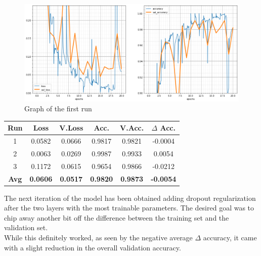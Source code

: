 \begin{figure}[H]
	\begin{center}
	\includegraphics[width=\linewidth]{Immagini/conv-drop-pool-1}
	\caption{Graph of the first run}
	\end{center}
\end{figure}
\begin{table}[H]
	\centering
	\begin{tabular}{cccccc}
		\textbf{Run} &\textbf{Loss}&\textbf{V.Loss} &\textbf{Acc.}&\textbf{V.Acc.}&\textbf{$\Delta$ Acc.} \\ \hline
		1   & 0.0582    & 0.0666    & 0.9817    & 0.9821    & -0.0004\\
		2   & 0.0063    & 0.0269    & 0.9987    & 0.9933    & 0.0054\\
		3   & 0.1172    & 0.0615    & 0.9654    & 0.9866    & -0.0212\\
		\textbf{Avg} & \textbf{0.0606}    & \textbf{0.0517}    & \textbf{0.9820}    & \textbf{0.9873}    & \textbf{-0.0054}
	\end{tabular}
\end{table}

The next iteration of the model has been obtained adding dropout regularization after the two layers with the most trainable parameters. The desired goal was to chip away another bit off the difference between the training set and the validation set.\\
While this definitely worked, as seen by the negative average $\Delta$ accuracy, it came with a slight reduction in the overall validation accuracy.